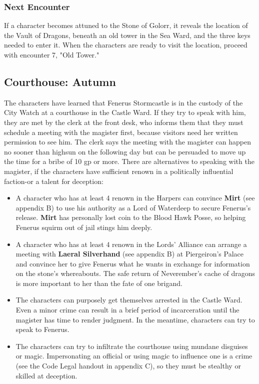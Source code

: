 \documentclass[10pt,a4paper,twoside,twocolumn,openany,nodeprecatedcode]{dndbook}
\begin{document}
\subsubsection{Next Encounter}
If a character becomes attuned to the Stone of Golorr, it reveals the location of the Vault of Dragons, beneath an old tower in the Sea Ward, and the three keys needed to enter it. When the characters are ready to visit the location, proceed with encounter 7, "Old Tower."
\subsection{Courthouse: Autumn}
The characters have learned that Fenerus Stormcastle is in the custody of the City Watch at a courthouse in the Castle Ward. If they try to speak with him, they are met by the clerk at the front desk, who informs them that they must schedule a meeting with the magister first, because visitors need her written permission to see him. The clerk says the meeting with the magister can happen no sooner than highsun on the following day but can be persuaded to move up the time for a bribe of 10 gp or more.
There are alternatives to speaking with the magister, if the characters have sufficient renown in a politically influential faction-or a talent for deception:
\begin{itemize}

\item A character who has at least 4 renown in the Harpers can convince \textbf{Mirt} (see appendix B) to use his authority as a Lord of Waterdeep to secure Fenerus's release. \textbf{Mirt} has personally lost coin to the Blood Hawk Posse, so helping Fenerus squirm out of jail stings him deeply.
\item A character who has at least 4 renown in the Lords' Alliance can arrange a meeting with \textbf{Laeral Silverhand} (see appendix B) at Piergeiron's Palace and convince her to give Fenerus what he wants in exchange for information on the stone's whereabouts. The safe return of Neverember's cache of dragons is more important to her than the fate of one brigand.
\item The characters can purposely get themselves arrested in the Castle Ward. Even a minor crime can result in a brief period of incarceration until the magister has time to render judgment. In the meantime, characters can try to speak to Fenerus.
\item The characters can try to infiltrate the courthouse using mundane disguises or magic. Impersonating an official or using magic to influence one is a crime (see the Code Legal handout in appendix C), so they must be stealthy or skilled at deception.
\end{itemize}
\end{document}
